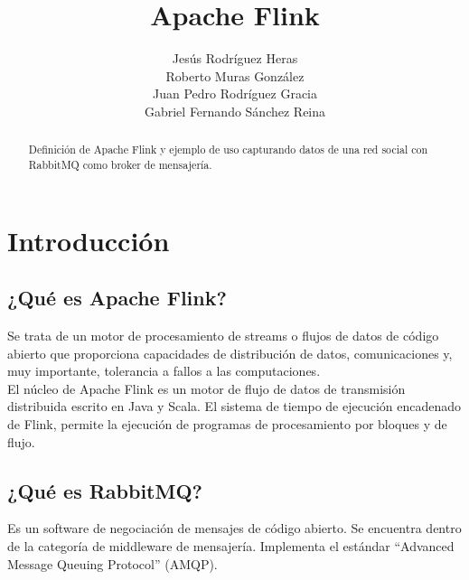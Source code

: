 \documentclass[12pt,letterpaper]{article}
\title{Apache Flink}
\author{Jesús Rodríguez Heras\\Roberto Muras González\\Juan Pedro Rodríguez Gracia\\Gabriel Fernando Sánchez Reina}
\begin{document}
	
	\maketitle
	\begin{abstract} %
		\begin{center}
			Definición de Apache Flink y ejemplo de uso capturando datos de una red social con RabbitMQ como broker de mensajería.
		\end{center}
	\end{abstract}
	\thispagestyle{empty}
	\newpage
	
	\tableofcontents
	\newpage
	
	
	
	
	\lstset{language=bash, numbers=left, numberstyle=\tiny, numbersep=10pt, firstnumber=1, stepnumber=1, basicstyle=\small\ttfamily, tabsize=1, extendedchars=true, inputencoding=latin1}


\section{Introducción}
\subsection{¿Qué es Apache Flink?}
Se trata de un motor de procesamiento de streams o flujos de datos de código abierto que proporciona capacidades de distribución de datos, comunicaciones y, muy importante, tolerancia a fallos a las computaciones.\\

El núcleo de Apache Flink es un motor de flujo de datos de transmisión distribuida escrito en Java y Scala. El sistema de tiempo de ejecución encadenado de Flink, permite la ejecución de programas de procesamiento por bloques y de flujo.

\subsection{¿Qué es RabbitMQ?}
Es un software de negociación de mensajes de código abierto. Se encuentra dentro de la categoría de middleware de mensajería. Implementa el estándar ``Advanced Message Queuing Protocol'' (AMQP).\\
\end{document}
